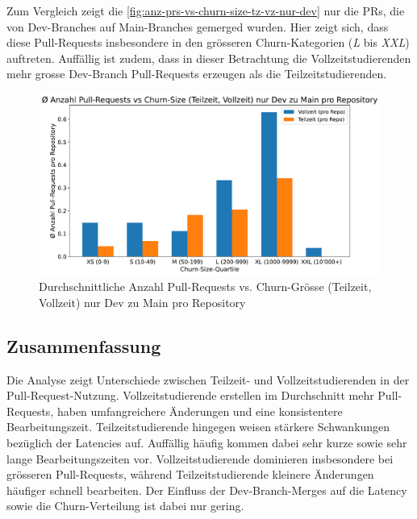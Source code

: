 \newpage
Zum Vergleich zeigt die \autoref{fig:anz-prs-vs-churn-size-tz-vz-nur-dev} nur die PRs, die von Dev-Branches auf Main-Branches gemerged wurden. Hier zeigt sich, dass diese Pull-Requests insbesondere in den grösseren Churn-Kategorien (\textit{L} bis \textit{XXL}) auftreten. Auffällig ist zudem, dass in dieser Betrachtung die Vollzeitstudierenden mehr grosse Dev-Branch Pull-Requests erzeugen als die Teilzeitstudierenden.

\begin{figure}[htbp]
    \includegraphics[width=\textwidth]{Figures/avg-anz-prs-vs-churn-size-tz-vz-pro-repo-nur-dev.pdf}
    \caption{Durchschnittliche Anzahl Pull-Requests vs. Churn-Grösse (Teilzeit, Vollzeit) nur Dev zu Main pro Repository}
    \label{fig:anz-prs-vs-churn-size-tz-vz-nur-dev}
\end{figure}

\subsection{Zusammenfassung}

Die Analyse zeigt Unterschiede zwischen Teilzeit- und Vollzeitstudierenden in der Pull-Request-Nutzung. Vollzeitstudierende erstellen im Durchschnitt mehr Pull-Requests, haben umfangreichere Änderungen und eine konsistentere Bearbeitungszeit. Teilzeitstudierende hingegen weisen stärkere Schwankungen bezüglich der Latencies auf. Auffällig häufig kommen dabei sehr kurze sowie sehr lange Bearbeitungszeiten vor. Vollzeitstudierende dominieren insbesondere bei grösseren Pull-Requests, während Teilzeitstudierende kleinere Änderungen häufiger schnell bearbeiten. Der Einfluss der Dev-Branch-Merges auf die Latency sowie die Churn-Verteilung ist dabei nur gering. 
